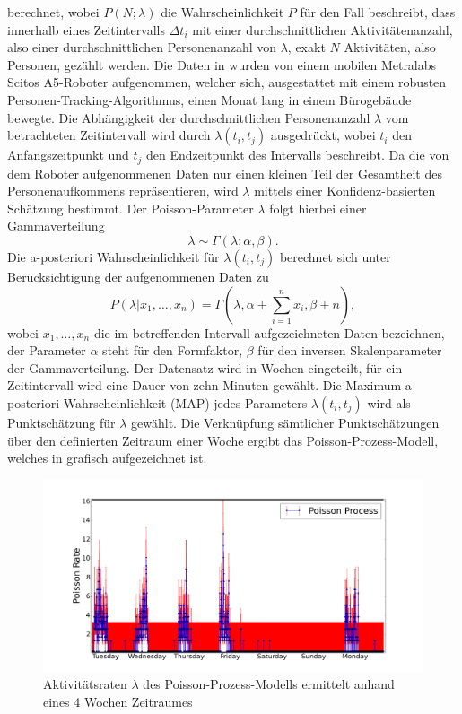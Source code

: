berechnet, wobei $P(N;\lambda)$ die Wahrscheinlichkeit $P$ für den Fall beschreibt, dass innerhalb eines Zeitintervalls $\Delta t_i$ mit einer durchschnittlichen Aktivitätenanzahl, also einer durchschnittlichen Personenanzahl von $\lambda$, exakt $N$ Aktivitäten, also Personen, gezählt werden. Die Daten in \cite{Jovan.2016} wurden von einem mobilen Metralabs Scitos A5-Roboter aufgenommen, welcher sich, ausgestattet mit einem robusten Personen-Tracking-Algorithmus, einen Monat lang in einem Bürogebäude bewegte. Die Abhängigkeit der durchschnittlichen Personenanzahl $\lambda$ vom betrachteten Zeitintervall wird durch $\lambda (t_i, t_j)$ ausgedrückt, wobei  $t_i$ den Anfangszeitpunkt und $t_j$ den Endzeitpunkt des Intervalls beschreibt. Da die von dem Roboter aufgenommenen Daten nur einen kleinen Teil der Gesamtheit des Personenaufkommens repräsentieren, wird $\lambda$ mittels einer Konfidenz-basierten Schätzung bestimmt. Der Poisson-Parameter $\lambda$ folgt hierbei einer Gammaverteilung
\begin{equation}
	\lambda \sim \Gamma(\lambda ; \alpha, \beta) .
\end{equation}
Die a-posteriori Wahrscheinlichkeit für $\lambda (t_i, t_j)$ berechnet sich unter Berücksichtigung der aufgenommenen Daten zu
\begin{equation}
	P(\lambda | x_1, \dots, x_n) = \Gamma(\lambda, \alpha + \sum_{i=1}^{n} x_i, \beta +n) ,
\end{equation}
wobei $x_1, \dots , x_n$ die im betreffenden Intervall aufgezeichneten Daten bezeichnen, der Parameter $\alpha$ steht für den Formfaktor, $\beta$ für den inversen Skalenparameter der Gammaverteilung.
Der Datensatz wird in Wochen eingeteilt, für ein Zeitintervall wird eine Dauer von zehn Minuten gewählt. Die Maximum a posteriori-Wahrscheinlichkeit (MAP) jedes Parameters $\lambda(t_i, t_j)$ wird als Punktschätzung für $\lambda$ gewählt. Die Verknüpfung sämtlicher Punktschätzungen über den definierten Zeitraum einer Woche ergibt das Poisson-Prozess-Modell, welches in  grafisch aufgezeichnet ist. 
\begin{figure}[!ht]
	\begin{center}
		\includegraphics[width=0.8\linewidth]{Abbildungen/stand_der_technik/poisson-prozess-model1}
		\caption{Aktivitätsraten $\lambda$ des Poisson-Prozess-Modells ermittelt anhand eines 4 Wochen Zeitraumes\, \cite{Jovan.2016}}
		\label{fig.poisson-prozess-model1}
	\end{center}
\end{figure}

